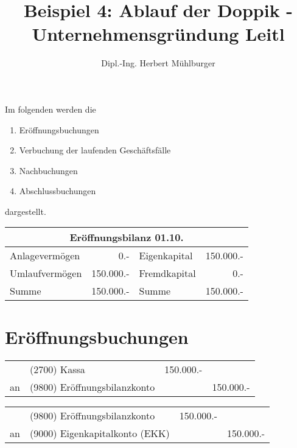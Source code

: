 \documentclass[parskip=half,12pt,a4paper]{scrartcl}
\begin{document}
\title{Beispiel 4: Ablauf der Doppik - Unternehmensgründung Leitl}
\author{Dipl.-Ing. Herbert Mühlburger}
\maketitle

Im folgenden werden die
\begin{enumerate}
	\item Eröffnungsbuchungen 
	\item Verbuchung der laufenden Geschäftsfälle
	\item Nachbuchungen
	\item Abschlussbuchungen
\end{enumerate}
dargestellt.

\begin{center}
	\begin{tabular}{lr|lr}
		\multicolumn{4}{c}{Eröffnungsbilanz 01.10.}\\
		\toprule
		Anlagevermögen & 0.- & Eigenkapital & 150.000.-\\
		Umlaufvermögen & 150.000.- & Fremdkapital & 0.-\\
		\bottomrule
		Summe & 150.000.- & Summe & 150.000.-\\
	\end{tabular}
\end{center}

\section{Eröffnungsbuchungen}

\begin{center}
\begin{tabularx}{\textwidth}{rXrr}
 \toprule
    & (2700) Kassa & 150.000.- &\\
 an & (9800) Eröffnungsbilanzkonto & & 150.000.-\\
 \bottomrule
\end{tabularx}
\end{center}

\begin{center}
\begin{tabularx}{\textwidth}{rXrr}
 \toprule
    & (9800) Eröffnungsbilanzkonto & 150.000.- &\\
 an & (9000) Eigenkapitalkonto (EKK) & & 150.000.-\\
\bottomrule
\end{tabularx}
\end{center}
\end{document}

